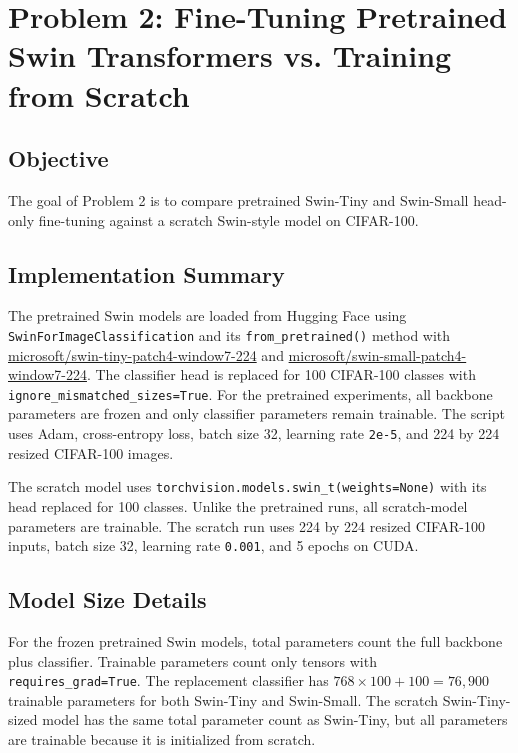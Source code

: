 \documentclass[11pt]{article}
\begin{document}
\section*{Problem 2: Fine-Tuning Pretrained Swin Transformers vs. Training from Scratch}
\subsection*{Objective}
The goal of Problem 2 is to compare pretrained Swin-Tiny and Swin-Small head-only fine-tuning against a scratch Swin-style model on CIFAR-100.

\subsection*{Implementation Summary}
The pretrained Swin models are loaded from Hugging Face using \texttt{SwinForImageClassification} and its \texttt{from\_pretrained()} method with \url{microsoft/swin-tiny-patch4-window7-224} and \url{microsoft/swin-small-patch4-window7-224}. The classifier head is replaced for 100 CIFAR-100 classes with \texttt{ignore\_mismatched\_sizes=True}. For the pretrained experiments, all backbone parameters are frozen and only classifier parameters remain trainable. The script uses Adam, cross-entropy loss, batch size 32, learning rate \texttt{2e-5}, and 224 by 224 resized CIFAR-100 images.

The scratch model uses \texttt{torchvision.models.swin\_t(weights=None)} with its head replaced for 100 classes. Unlike the pretrained runs, all scratch-model parameters are trainable. The scratch run uses 224 by 224 resized CIFAR-100 inputs, batch size 32, learning rate \texttt{0.001}, and 5 epochs on CUDA.

\subsection*{Model Size Details}
For the frozen pretrained Swin models, total parameters count the full backbone plus classifier. Trainable parameters count only tensors with \texttt{requires\_grad=True}. The replacement classifier has $768 \times 100 + 100 = 76,900$ trainable parameters for both Swin-Tiny and Swin-Small. The scratch Swin-Tiny-sized model has the same total parameter count as Swin-Tiny, but all parameters are trainable because it is initialized from scratch.
\end{document}
